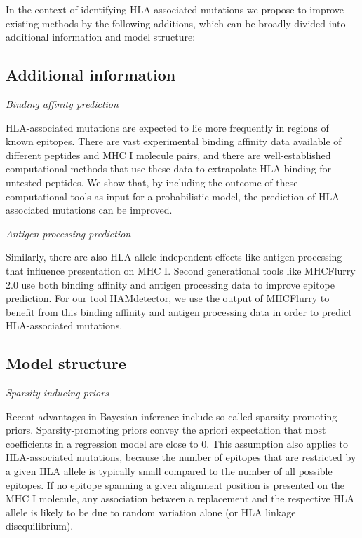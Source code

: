 \documentclass[fleqn,11pt]{SelfArx} %
\begin{document}
In the context of identifying HLA-associated mutations we propose to improve existing
methods by the following additions, which can be broadly divided into additional information
and model structure:
\subsection*{Additional information}

  \textit{Binding affinity prediction}

    HLA-associated mutations are expected to lie more frequently in regions of known
    epitopes. There are vast experimental binding affinity data available of different
    peptides and MHC I molecule pairs, and there are well-established computational
    methods that use these data to extrapolate HLA binding for untested peptides.
    We show that, by including the outcome of these computational tools as input for a
    probabilistic model, the prediction of HLA-associated mutations can be improved.

  \textit{Antigen processing prediction}
  
  Similarly, there are also HLA-allele independent effects like antigen processing
  that influence presentation on MHC I. Second generational tools like
  MHCFlurry 2.0 use both binding affinity and antigen processing data to improve
  epitope prediction. For our tool HAMdetector, we use the output of MHCFlurry to
  benefit from this binding affinity and antigen processing data in order to predict
  HLA-associated mutations.


\subsection*{Model structure}

  \textit{Sparsity-inducing priors}
  
  Recent advantages in Bayesian inference include so-called sparsity-promoting priors.
  Sparsity-promoting priors convey the apriori expectation that most coefficients in 
  a regression model are close to 0.
  This assumption also applies to HLA-associated mutations, because the number of epitopes
  that are restricted by a given HLA allele is typically small compared to the number
  of all possible epitopes. If no epitope spanning a given alignment position is presented
  on the MHC I molecule, any association between a replacement and the respective HLA allele 
  is likely to be due to random variation alone (or HLA linkage disequilibrium).
  
\end{document}
